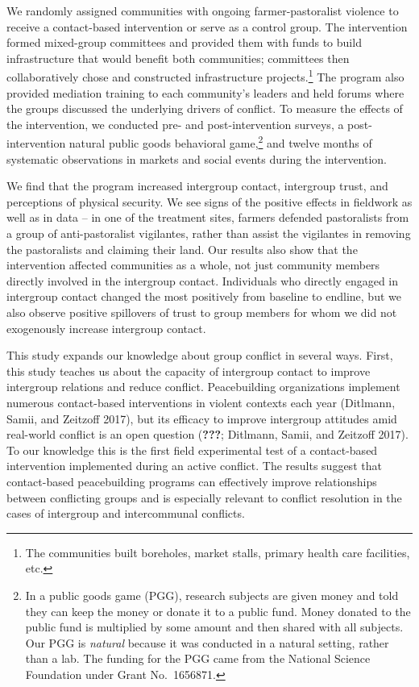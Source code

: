 \documentclass[11pt]{article}
\begin{document}
We randomly assigned communities with ongoing farmer-pastoralist
violence to receive a contact-based intervention or serve as a control
group. The intervention formed mixed-group committees and provided them
with funds to build infrastructure that would benefit both communities;
committees then collaboratively chose and constructed infrastructure
projects.\footnote{The communities built boreholes, market stalls,
  primary health care facilities, etc.} The program also provided
mediation training to each community's leaders and held forums where the
groups discussed the underlying drivers of conflict. To measure the
effects of the intervention, we conducted pre- and post-intervention
surveys, a post-intervention natural public goods behavioral
game,\footnote{In a public goods game (PGG), research subjects are given
  money and told they can keep the money or donate it to a public fund.
  Money donated to the public fund is multiplied by some amount and then
  shared with all subjects. Our PGG is \emph{natural} because it was
  conducted in a natural setting, rather than a lab. The funding for the
  PGG came from the National Science Foundation under Grant No.~1656871.}
and twelve months of systematic observations in markets and social
events during the intervention.

We find that the program increased intergroup contact, intergroup trust,
and perceptions of physical security. We see signs of the positive
effects in fieldwork as well as in data -- in one of the treatment
sites, farmers defended pastoralists from a group of anti-pastoralist
vigilantes, rather than assist the vigilantes in removing the
pastoralists and claiming their land. Our results also show that the
intervention affected communities as a whole, not just community members
directly involved in the intergroup contact. Individuals who directly
engaged in intergroup contact changed the most positively from baseline
to endline, but we also observe positive spillovers of trust to group
members for whom we did not exogenously increase intergroup contact.

This study expands our knowledge about group conflict in several ways.
First, this study teaches us about the capacity of intergroup contact to
improve intergroup relations and reduce conflict. Peacebuilding
organizations implement numerous contact-based interventions in violent
contexts each year (Ditlmann, Samii, and Zeitzoff 2017), but its
efficacy to improve intergroup attitudes amid real-world conflict is an
open question ({\textbf{???}}; Ditlmann, Samii, and Zeitzoff 2017). To
our knowledge this is the first field experimental test of a
contact-based intervention implemented during an active conflict. The
results suggest that contact-based peacebuilding programs can
effectively improve relationships between conflicting groups and is
especially relevant to conflict resolution in the cases of intergroup
and intercommunal conflicts.
\end{document}
